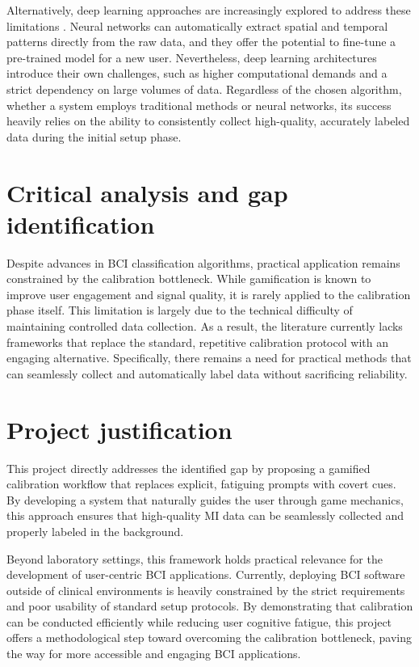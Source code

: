 \documentclass[a4paper, 11pt, openany]{report}
\let\cite\citep
\begin{document}
    Alternatively, deep learning approaches are increasingly explored to address these limitations \cite{lawhern2018eegnet}. Neural 
    networks can automatically extract spatial and temporal patterns directly from the raw data, and they 
    offer the potential to fine-tune a pre-trained model for a new user. Nevertheless, deep learning architectures 
    introduce their own challenges, such as higher computational demands and a strict dependency on large 
    volumes of data. Regardless of the chosen algorithm, whether a system employs traditional methods or 
    neural networks, its success heavily relies on the ability to consistently collect high-quality, accurately 
    labeled data during the initial setup phase.

    \section{Critical analysis and gap identification}
    Despite advances in BCI classification algorithms, practical application 
    remains 
    constrained 
    by the calibration 
    bottleneck. While gamification is known to improve user engagement and signal quality, it is rarely applied 
    to the calibration phase itself. This limitation is largely due to the technical difficulty of maintaining 
    controlled data collection. As a result, the literature currently lacks frameworks that replace the 
    standard, repetitive calibration protocol with an engaging alternative. Specifically, there remains a 
    need for practical methods that can seamlessly collect and automatically label data without sacrificing 
    reliability.

    \section{Project justification}
    This project directly addresses the identified gap by proposing a gamified calibration workflow that replaces explicit, fatiguing prompts with covert cues. By developing a system that naturally guides the user through game mechanics, this approach ensures that high-quality MI data can be seamlessly collected and properly labeled in the background.

    Beyond laboratory settings, this framework holds practical relevance for the development of user-centric BCI applications. Currently, deploying BCI software outside of clinical environments is heavily constrained by the strict requirements and poor usability of standard setup protocols. By demonstrating that calibration can be conducted efficiently while reducing user cognitive fatigue, this project offers a methodological step toward overcoming the calibration bottleneck, paving the way for more accessible and engaging BCI applications.
\end{document}
